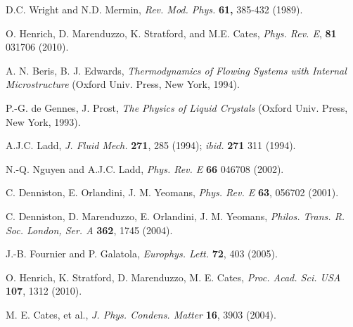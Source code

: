 \documentclass[12pt,twoside]{article}
\begin{document}
\begin{thebibliography}{99}

D.C. Wright and N.D. Mermin,
{\it Rev. Mod. Phys.} {\bf 61,} 385-432 (1989).




O. Henrich, D. Marenduzzo, K. Stratford, and M.E. Cates,
\textit{Phys. Rev. E}, \textbf{81} 031706 (2010).

A. N. Beris, B. J. Edwards, 
{\it Thermodynamics of Flowing Systems with Internal Microstructure}
(Oxford Univ. Press, New York, 1994).

P.-G. de Gennes, J. Prost,
{\it The Physics of Liquid Crystals} (Oxford Univ. Press, New York, 1993).

A.J.C. Ladd,
\textit{J. Fluid Mech.} \textbf{271}, 285 (1994); \textit{ibid.} \textbf{271}
311 (1994).

N.-Q. Nguyen and A.J.C. Ladd,
\textit{Phys. Rev. E} \textbf{66} 046708 (2002).

C. Denniston, E. Orlandini, J. M. Yeomans, 
\textit{Phys. Rev. E} \textbf{63}, 056702 (2001).

C. Denniston, D. Marenduzzo, E. Orlandini, J. M.  Yeomans, 
\textit{Philos. Trans. R. Soc. London, Ser. A} \textbf{362}, 1745 (2004).

J.-B. Fournier and P. Galatola,
\textit{Europhys. Lett.} \textbf{72}, 403 (2005).

O. Henrich, K. Stratford, D. Marenduzzo, M. E. Cates, 
\textit{Proc. Acad. Sci. USA} \textbf{107}, 1312 (2010).

 M. E. Cates,  et al., 
\textit{J. Phys. Condens. Matter} \textbf{16},  3903 (2004). 


\end{thebibliography}
\end{document}
